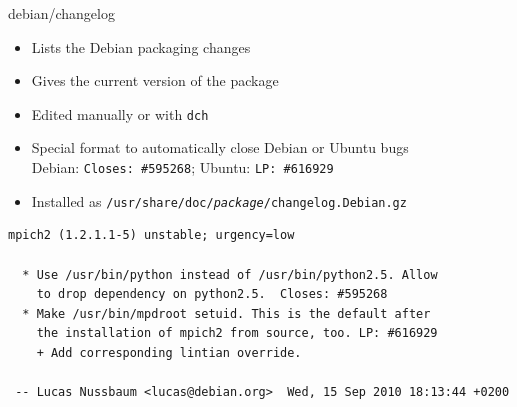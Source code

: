 \documentclass[10pt,final]{beamer}
\begin{document}
\begin{frame}[fragile]{debian/changelog}
  \begin{itemize}
  \item Lists the Debian packaging changes
  \item Gives the current version of the package
  \begin{center}
\end{center}


  \item Edited manually or with \texttt{dch}
  \item Special format to automatically close Debian or Ubuntu bugs\\
    Debian: \texttt{Closes:~\#595268}; Ubuntu: \texttt{LP:~\#616929}
  \item Installed as \texttt{/usr/share/doc/\textit{package}/changelog.Debian.gz}
  \end{itemize}
  \seprule
  \begin{lstlisting}[basicstyle=\ttfamily\footnotesize]
mpich2 (1.2.1.1-5) unstable; urgency=low

  * Use /usr/bin/python instead of /usr/bin/python2.5. Allow
    to drop dependency on python2.5.  Closes: #595268
  * Make /usr/bin/mpdroot setuid. This is the default after
    the installation of mpich2 from source, too. LP: #616929
    + Add corresponding lintian override.

 -- Lucas Nussbaum <lucas@debian.org>  Wed, 15 Sep 2010 18:13:44 +0200
\end{lstlisting}
\end{frame}
\end{document}
